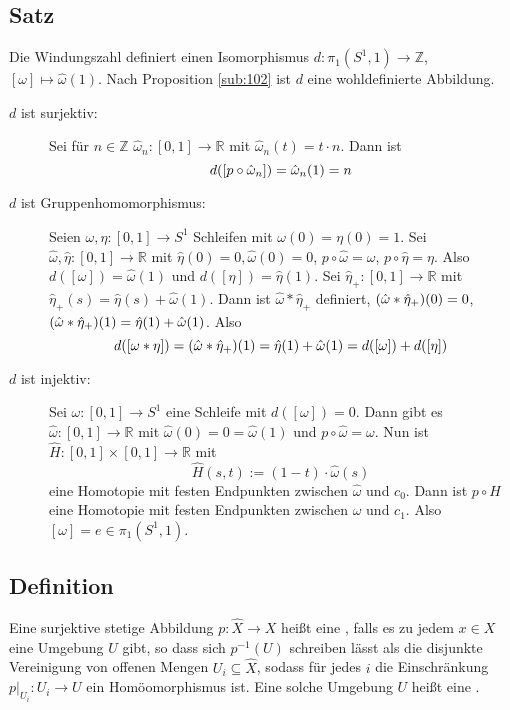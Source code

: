 \subsection[Satz: Die Windungszahl definiert einen Isomorphismus $ \pi_1(S^1,1) \cong \mathds{Z}$]{Satz} %
\label{sub:104}
Die Windungszahl definiert einen Isomorphismus $d : \pi_1(S^1,1) \to \mathds{Z}$, $[\omega] \mapsto \hat{\omega}(1)$.
Nach Proposition \ref{sub:102} ist $d$ eine wohldefinierte Abbildung. 
\begin{description}
	\item[$d$ ist surjektiv:] Sei für $n \in \mathds{Z}$ $\hat{\omega}_n : [0,1] \to \mathds{R}$ mit $\hat{\omega}_n (t) = t \cdot n$. Dann ist 
	\[
		d \enbrace*{ \benbrace*{p \circ  \hat{\omega}_n}} = \hat{\omega}_n(1) = n 
	\]
	\item[$d$ ist Gruppenhomomorphismus:] Seien $\omega, \eta : [0,1] \to S^1$ Schleifen mit 
	$\omega(0)= \eta(0) = 1$. Sei $\hat{\omega}, \hat{\eta} : [0,1] \to \mathds{R}$ mit 
	$\hat{\eta}(0)=0, \hat{\omega}(0)=0$, $p \circ  \hat{\omega} = \omega$, $p \circ \hat{\eta} = \eta$. Also $d( [\omega]) = \hat{\omega}(1)$ und 
	$d([\eta]) = \hat{\eta}(1)$. Sei $\hat{\eta}_+ : [0,1] \to \mathds{R}$ mit $\hat{\eta}_+ (s) = \hat{\eta}(s) + \hat{\omega}(1)$. Dann ist $\hat{\omega} * \hat{\eta}_+$
	definiert, $\enbrace*{\hat{\omega} * \hat{\eta}_+}(0) = 0 $, $\enbrace*{\hat{\omega} * \hat{\eta}_+}(1) = \hat{\eta}(1) + \hat{\omega}(1)$. Also
	\[
		d \enbrace*{[\omega * \eta]} = \enbrace*{ \hat{\omega} * \hat{\eta}_+} (1) = \hat{\eta}(1) + \hat{\omega}(1) = d([\omega]) + d([\eta])  
	\]
	\item[$d$ ist injektiv:] Sei $\omega : [0,1] \to S^1$ eine Schleife mit $d([\omega]) = 0$. Dann gibt es $\hat{\omega} : [0,1] \to \mathds{R}$ mit 
	$\hat{\omega}(0)= 0 = \hat{\omega}(1)$ und $p \circ  \hat{\omega} = \omega$. Nun ist $\hat{H} : [0,1] \times [0,1] \to \mathds{R}$ mit 
	\[
		\hat{H} (s,t) := (1-t)\cdot  \hat{\omega}(s)
	\]
	eine Homotopie mit festen Endpunkten zwischen $\hat{\omega}$ und $c_0$. Dann ist $p \circ  H$ eine Homotopie mit festen Endpunkten zwischen $\omega$ und $c_1$.
	Also $[\omega] = e \in \pi_1(S^1,1)$. \bewende
\end{description}

\subsection[Definition: Überlagerung und elementare Umgebung]{Definition} %
\label{sub:105}
Eine surjektive stetige Abbildung $p : \hat{X} \to X$ heißt eine , falls es zu jedem $x \in X$ eine Umgebung $U$ gibt, so dass sich $p ^{-1}(U)$ 
schreiben lässt als die disjunkte Vereinigung von offenen Mengen $U_i  \subseteq \hat{X}$, sodass für jedes $i$ die Einschränkung $p\big|_{U_i} : U_i \to U$ ein 
Homöomorphismus ist. Eine solche Umgebung $U$ heißt eine . 

